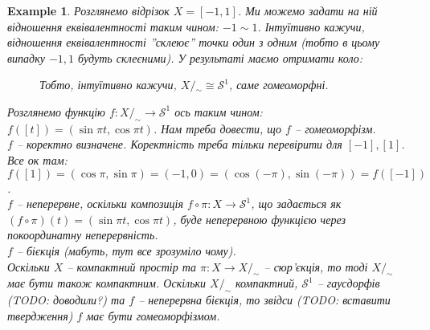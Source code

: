 \documentclass[a4paper, 10pt]{article}
\theoremstyle{theoremdd}
\newtheorem{example}[theorem]{Example}
\begin{document}
\begin{example}
Розглянемо відрізок $X = [-1,1]$. Ми можемо задати на ній відношення еквівалентності таким чином: $-1 \sim 1$. Інтуїтивно кажучи, відношення еквівалентності ''склеює'' точки один з одним (тобто в цьому випадку $-1,1$ будуть склеєними). У результаті маємо отримати коло:
\begin{figure}[H]
\centering
{}
\qquad
{}
\caption*{Тобто, інтуїтивно кажучи, $X/{_\sim} \cong \mathcal{S}^1$, саме гомеоморфні.}
\end{figure}
\noindent
Розглянемо функцію $f \colon X/_{\sim} \to \mathcal{S}^1$ ось таким чином: $f([t]) = (\sin \pi t, \cos \pi t)$. Нам треба довести, що $f$ -- гомеоморфізм.\\
$f$ -- коректно визначене. Коректність треба тільки перевірити для $[-1],[1]$. Все ок там:\\
$f([1]) = (\cos \pi, \sin \pi) = (-1, 0) = (\cos (-\pi), \sin(-\pi)) = f([-1])$.\\
$f$ -- неперервне, оскільки композиція $f \circ \pi \colon X \to \mathcal{S}^1$, що задається як $(f \circ \pi)(t) = (\sin \pi t, \cos \pi t)$, буде неперервною функцією через покоординатну неперервність.\\
$f$ -- бієкція (мабуть, тут все зрозуміло чому).\\
Оскільки $X$ -- компактний простір та $\pi \colon X \to X/_{\sim}$ -- сюр'єкція, то тоді $X/_{\sim}$ має бути також компактним. Оскільки $X/_{\sim}$ компактний, $\mathcal{S}^1$ -- гаусдорфів (TODO: доводили?) та $f$ -- неперервна бієкція, то звідси (TODO: вставити твердження) $f$ має бути гомеоморфізмом.
\end{example}
\end{document}
